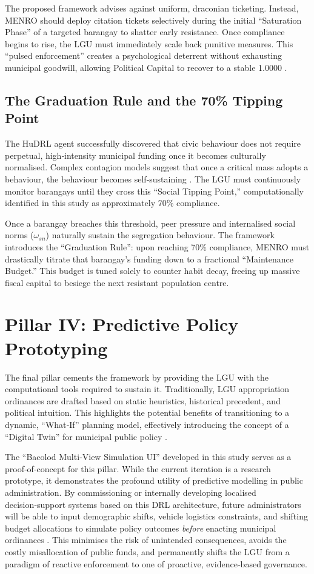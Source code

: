 The proposed framework advises against uniform, draconian ticketing. Instead, MENRO should deploy citation tickets selectively during the initial “Saturation Phase” of a targeted barangay to shatter early resistance. Once compliance begins to rise, the LGU must immediately scale back punitive measures. This “pulsed enforcement” creates a psychological deterrent without exhausting municipal goodwill, allowing Political Capital to recover to a stable 1.0000 \citep{Ayres1992}.

\subsection{The Graduation Rule and the 70\% Tipping Point}

The HuDRL agent successfully discovered that civic behaviour does not require perpetual, high‑intensity municipal funding once it becomes culturally normalised. Complex contagion models suggest that once a critical mass adopts a behaviour, the behaviour becomes self‑sustaining \citep{Centola2018}. The LGU must continuously monitor barangays until they cross this “Social Tipping Point,” computationally identified in this study as approximately 70\% compliance.

Once a barangay breaches this threshold, peer pressure and internalised social norms (\(\omega_{sn}\)) naturally sustain the segregation behaviour. The framework introduces the “Graduation Rule”: upon reaching 70\% compliance, MENRO must drastically titrate that barangay’s funding down to a fractional “Maintenance Budget.” This budget is tuned solely to counter habit decay, freeing up massive fiscal capital to besiege the next resistant population centre.

\section{Pillar IV: Predictive Policy Prototyping}
\label{sec:pillar4}

The final pillar cements the framework by providing the LGU with the computational tools required to sustain it. Traditionally, LGU appropriation ordinances are drafted based on static heuristics, historical precedent, and political intuition. This highlights the potential benefits of transitioning to a dynamic, “What‑If” planning model, effectively introducing the concept of a “Digital Twin” for municipal public policy \citep{Batty2018}.

The “Bacolod Multi‑View Simulation UI” developed in this study serves as a proof‑of‑concept for this pillar. While the current iteration is a research prototype, it demonstrates the profound utility of predictive modelling in public administration. By commissioning or internally developing localised decision‑support systems based on this DRL architecture, future administrators will be able to input demographic shifts, vehicle logistics constraints, and shifting budget allocations to simulate policy outcomes \textit{before} enacting municipal ordinances \citep{Kitchin2014}. This minimises the risk of unintended consequences, avoids the costly misallocation of public funds, and permanently shifts the LGU from a paradigm of reactive enforcement to one of proactive, evidence‑based governance.